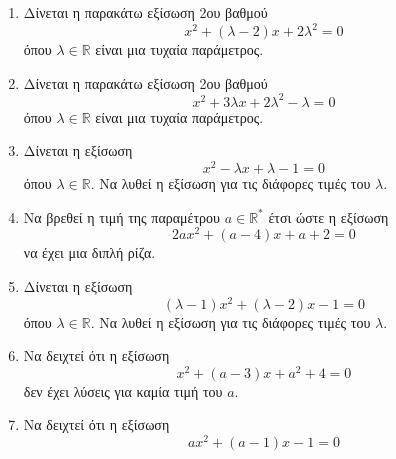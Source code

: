 \documentclass[11pt,a4paper]{article}
\begin{document}
\begin{enumerate}
\item
Δίνεται η παρακάτω εξίσωση 2{ου} βαθμού
\[ x^2+(\lambda-2) x+2\lambda^2=0 \]
όπου $ \lambda\in\mathbb{R} $ είναι μια τυχαία παράμετρος.
\item %
Δίνεται η παρακάτω εξίσωση 2ου βαθμού
\[ x^2+3\lambda x+2\lambda^2-\lambda=0 \]
όπου $ \lambda\in\mathbb{R} $ είναι μια τυχαία παράμετρος.
\item %
Δίνεται η εξίσωση 
\[ x^2-\lambda x+\lambda-1=0 \]
όπου $ \lambda\in\mathbb{R} $. Να λυθεί η εξίσωση για τις διάφορες τιμές του $ \lambda $.
\item %
Να βρεθεί η τιμή της παραμέτρου $ a\in\mathbb{R}^* $ έτσι ώστε η εξίσωση
\[ 2ax^2+(a-4)x+a+2=0 \]
να έχει μια διπλή ρίζα.
\item %
Δίνεται η εξίσωση
\[ (\lambda-1)x^2+(\lambda-2)x-1=0 \]
όπου $ \lambda\in\mathbb{R} $. Να λυθεί η εξίσωση για τις διάφορες τιμές του $ \lambda $.
\item %
Να δειχτεί ότι η εξίσωση
\[ x^2+(a-3) x+a^2+4=0 \]
δεν έχει λύσεις για καμία τιμή του $ a $.
\item %
Να δειχτεί ότι η εξίσωση
\[ ax^2+(a-1)x-1=0 \]
\end{enumerate}
\end{document}
